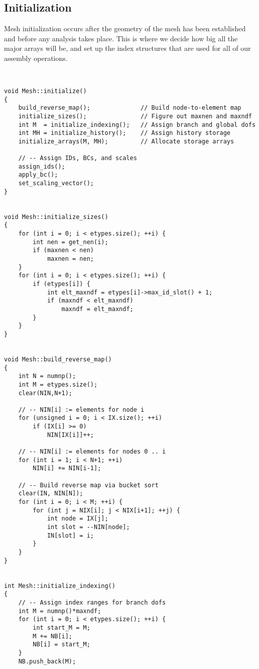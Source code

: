 \subsection{Initialization}

Mesh initialization occurs after the geometry of the mesh has been
established and before any analysis takes place.  This is where we
decide how big all the major arrays will be, and set up the index
structures that are used for all of our assembly operations.

\begin{verbatim}


void Mesh::initialize()
{
    build_reverse_map();              // Build node-to-element map
    initialize_sizes();               // Figure out maxnen and maxndf
    int M  = initialize_indexing();   // Assign branch and global dofs
    int MH = initialize_history();    // Assign history storage
    initialize_arrays(M, MH);         // Allocate storage arrays

    // -- Assign IDs, BCs, and scales
    assign_ids();
    apply_bc();
    set_scaling_vector();
}


void Mesh::initialize_sizes()
{
    for (int i = 0; i < etypes.size(); ++i) {
        int nen = get_nen(i);
        if (maxnen < nen)
            maxnen = nen;
    }
    for (int i = 0; i < etypes.size(); ++i) {
        if (etypes[i]) {
            int elt_maxndf = etypes[i]->max_id_slot() + 1;
            if (maxndf < elt_maxndf)
                maxndf = elt_maxndf;
        }
    }
}


void Mesh::build_reverse_map()
{
    int N = numnp();
    int M = etypes.size();
    clear(NIN,N+1);

    // -- NIN[i] := elements for node i
    for (unsigned i = 0; i < IX.size(); ++i)
        if (IX[i] >= 0)
            NIN[IX[i]]++;

    // -- NIN[i] := elements for nodes 0 .. i
    for (int i = 1; i < N+1; ++i)
        NIN[i] += NIN[i-1];

    // -- Build reverse map via bucket sort
    clear(IN, NIN[N]);
    for (int i = 0; i < M; ++i) {
        for (int j = NIX[i]; j < NIX[i+1]; ++j) {
            int node = IX[j];
            int slot = --NIN[node];
            IN[slot] = i;
        }
    }
}


int Mesh::initialize_indexing()
{
    // -- Assign index ranges for branch dofs
    int M = numnp()*maxndf;
    for (int i = 0; i < etypes.size(); ++i) {
        int start_M = M;
        M += NB[i];
        NB[i] = start_M;
    }
    NB.push_back(M);


\end{verbatim}
